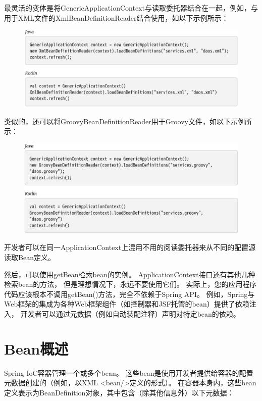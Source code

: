 最灵活的变体是将GenericApplicationContext与读取委托器结合在一起，例如，与用于XML文件的XmlBeanDefinitionReader结合使用，如以下示例所示：

\begin{figure}[ht]
    \centering
    \includegraphics[width=1\linewidth]{./Figure/IMG_code_10.png}
\end{figure}
\newpage
类似的，还可以将GroovyBeanDefinitionReader用于Groovy文件，如以下示例所示：

\begin{figure}[ht]
    \centering
    \includegraphics[width=1\linewidth]{./Figure/IMG_code_11.png}
\end{figure}

开发者可以在同一ApplicationContext上混用不用的阅读委托器来从不同的配置源读取Bean定义。

然后，可以使用getBean检索bean的实例。 
ApplicationContext接口还有其他几种检索bean的方法，
但是理想情况下，永远不要使用它们。 
实际上，您的应用程序代码应该根本不调用getBean()方法，完全不依赖于Spring API。 
例如，Spring与Web框架的集成为各种Web框架组件（如控制器和JSF托管的bean）提供了依赖注入，
开发者可以通过元数据（例如自动装配注释）声明对特定bean的依赖。

\section{Bean概述}
Spring IoC容器管理一个或多个bean。 
这些bean是使用开发者提供给容器的配置元数据创建的（例如，以XML <bean/>定义的形式）。 
在容器本身内，这些bean定义表示为BeanDefinition对象，其中包含（除其他信息外）以下元数据：

